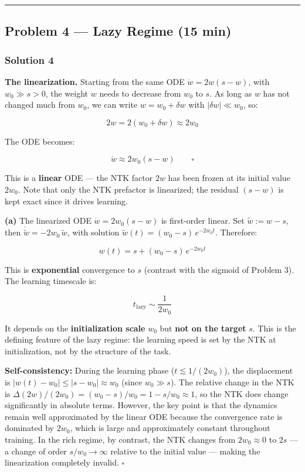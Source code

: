 \documentclass[
]{article}
\begin{document}
\begin{center}\rule{0.5\linewidth}{0.5pt}\end{center}

\subsection{Problem 4 --- Lazy Regime (15
min)}\label{problem-4-lazy-regime-15-min}

\subsubsection{Solution 4}\label{solution-4}

\textbf{The linearization.} Starting from the same ODE
\(\dot{w} = 2w(s - w)\), with
\(w_0 \gg s > 0\), the weight \(w\) needs to decrease from \(w_0\) to
\(s\). As long as \(w\) has not changed much from \(w_0\), we can write
\(w = w_0 + \delta w\) with \(|\delta w| \ll w_0\), so:

\[2w = 2(w_0 + \delta w) \approx 2w_0\]

The ODE becomes:

\[\dot{w} \approx 2w_0(s - w) \qquad \square\]

This is a \textbf{linear} ODE --- the NTK factor \(2w\) has been frozen
at its initial value \(2w_0\). Note that only the NTK prefactor is
linearized; the residual \((s - w)\) is kept exact since it drives
learning.

\textbf{(a)} The linearized ODE \(\dot{w} = 2w_0(s - w)\) is first-order
linear. Set \(\tilde{w} := w - s\), then
\(\dot{\tilde{w}} = -2w_0\,\tilde{w}\), with solution
\(\tilde{w}(t) = (w_0 - s)\,e^{-2w_0 t}\). Therefore:

\[\boxed{w(t) = s + (w_0 - s)\,e^{-2w_0 t}}\]

This is \textbf{exponential} convergence to \(s\) (contrast with the
sigmoid of Problem 3). The learning timescale is:

\[t_{\text{lazy}} \sim \frac{1}{2w_0}\]

It depends on the \textbf{initialization scale} \(w_0\) but \textbf{not
on the target} \(s\). This is the defining feature of the lazy regime:
the learning speed is set by the NTK at initialization, not by the
structure of the task.

\textbf{Self-consistency:} During the learning phase
(\(t \lesssim 1/(2w_0)\)), the displacement is
\(|w(t) - w_0| \leq |s - w_0| \approx w_0\) (since \(w_0 \gg s\)). The
relative change in the NTK is
\(\Delta(2w)/(2w_0) = (w_0 - s)/w_0 = 1 - s/w_0 \approx 1\), so the NTK
does change significantly in absolute terms. However, the key point is
that the dynamics remain well approximated by the linear ODE because the
convergence rate is dominated by \(2w_0\), which is large and
approximately constant throughout training. In the rich regime, by
contrast, the NTK changes from \(2w_0 \approx 0\) to \(2s\) --- a change
of order \(s/w_0 \to \infty\) relative to the initial value --- making
the linearization completely invalid. \(\square\)
\end{document}
